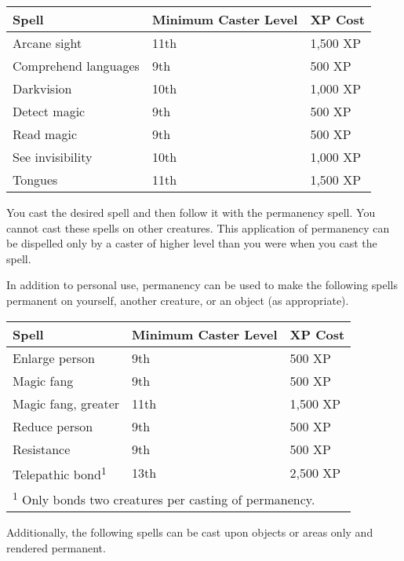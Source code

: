 \begin{multicols}{2}
\begin{small}
\begin{center}
\begin{tabular}[h!]{p{.75in}|p{.5in}l}
Spell & Minimum Caster Level & XP Cost \\ \hline
Arcane sight & 11th & 1,500 XP \\
Comprehend languages & 9th & 500 XP \\
Darkvision & 10th & 1,000 XP \\
Detect magic & 9th & 500 XP \\
Read magic & 9th & 500 XP \\
See invisibility & 10th & 1,000 XP \\
Tongues & 11th & 1,500 XP \\
\end{tabular}
\end{center}

\smallskip\noindent You cast the desired spell and then follow it with the permanency spell. You cannot cast these spells on other creatures. This application of permanency can be dispelled only by a caster of higher level than you were when you cast the spell.

\smallskip\noindent In addition to personal use, permanency can be used to make the following spells permanent on yourself, another creature, or an object (as appropriate).
 
\begin{center}
\begin{tabular}[h!]{p{.75in}|p{.5in}l}
Spell & Minimum Caster Level & XP Cost \\ \hline
Enlarge person & 9th & 500 XP	\\
Magic fang & 9th & 500 XP \\	   
Magic fang, greater & 11th & 1,500 XP	\\
Reduce person & 9th & 500 XP \\
Resistance & 9th & 500 XP	\\
Telepathic bond\textsuperscript{1} & 13th & 2,500 XP \\ \hline
\multicolumn{3}{p{3in}}{\textsuperscript{1} Only bonds two creatures per casting of permanency.} \\
\end{tabular}
\end{center}

\smallskip\noindent Additionally, the following spells can be cast upon objects or areas only and rendered permanent.


\end{small}
\end{multicols}
